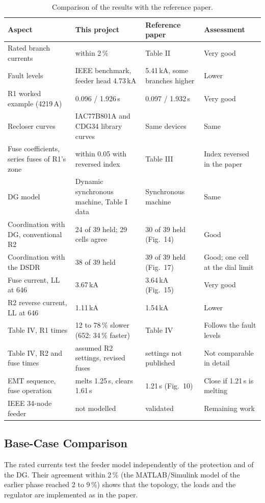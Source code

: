 \documentclass[12pt,letterpaper]{article}
\newcommand{\hd}{\rowcolor{headc}}
\begin{document}
\begin{table}[H]
\centering\footnotesize
\begin{tabularx}{\textwidth}{@{}LLLl@{}}
\toprule
\hd\textbf{Aspect} & \textbf{This project} & \textbf{Reference paper} & \textbf{Assessment} \\
\midrule
Rated branch currents & within 2\,\% & Table II & Very good \\
Fault levels & IEEE benchmark, feeder head 4.73\,kA & 5.41\,kA, some branches higher & Lower \\
R1 worked example (4219\,A) & 0.096 / 1.926\,s & 0.097 / 1.932\,s & Very good \\
Recloser curves & IAC77B801A and CDG34 library curves & Same devices & Same \\
Fuse coefficients, series fuses of R1's zone & within 0.05 with reversed index & Table III & Index reversed in the paper \\
DG model & Dynamic synchronous machine, Table I data & Synchronous machine & Same \\
Coordination with DG, conventional R2 & 24 of 39 held; 29 cells agree & 30 of 39 held (Fig.~14) & Good \\
Coordination with the DSDR & 38 of 39 held & 39 of 39 held (Fig.~17) & Good; one cell at the dial limit \\
Fuse current, LL at 646 & 3.67\,kA & 3.64\,kA (Fig.~15) & Very good \\
R2 reverse current, LL at 646 & 1.11\,kA & 1.54\,kA & Lower \\
Table IV, R1 times & 12 to 78\,\% slower (652: 34\,\% faster) & Table IV & Follows the fault levels \\
Table IV, R2 and fuse times & assumed R2 settings, revised fuses & settings not published & Not comparable in detail \\
EMT sequence, fuse operation & melts 1.25\,s, clears 1.61\,s & 1.21\,s (Fig.~10) & Close if 1.21\,s is melting \\
IEEE 34-node feeder & not modelled & validated & Remaining work \\
\bottomrule
\end{tabularx}
\caption{Comparison of the results with the reference paper.}
\label{tab:compare}
\end{table}

\subsection{Base-Case Comparison}
The rated currents test the feeder model independently of the protection and of the DG. Their agreement
within 2\,\% (the MATLAB/Simulink model of the earlier phase reached 2 to 9\,\%) shows that the topology, the
loads and the regulator are implemented as in the paper.
\end{document}
